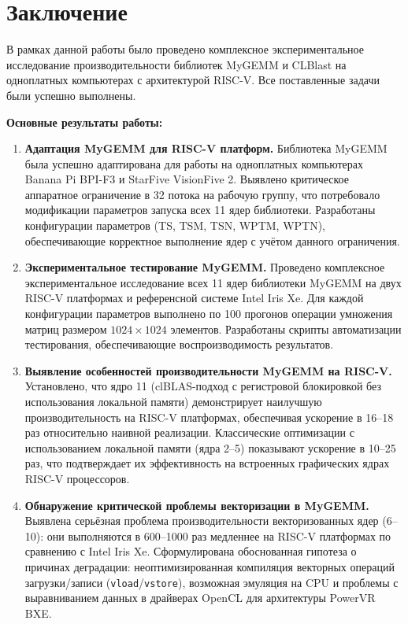 
\section*{Заключение}

В рамках данной работы было проведено комплексное экспериментальное исследование производительности библиотек MyGEMM и CLBlast на одноплатных компьютерах с архитектурой RISC-V. Все поставленные задачи были успешно выполнены.

\textbf{Основные результаты работы:}

\begin{enumerate}
    \item \textbf{Адаптация MyGEMM для RISC-V платформ.} Библиотека MyGEMM была успешно адаптирована для работы на одноплатных компьютерах Banana Pi BPI-F3 и StarFive VisionFive 2. Выявлено критическое аппаратное ограничение в 32 потока на рабочую группу, что потребовало модификации параметров запуска всех 11 ядер библиотеки. Разработаны конфигурации параметров (TS, TSM, TSN, WPTM, WPTN), обеспечивающие корректное выполнение ядер с учётом данного ограничения.
    
    \item \textbf{Экспериментальное тестирование MyGEMM.} Проведено комплексное экспериментальное исследование всех 11 ядер библиотеки MyGEMM на двух RISC-V платформах и референсной системе Intel Iris Xe. Для каждой конфигурации параметров выполнено по 100 прогонов операции умножения матриц размером $1024 \times 1024$ элементов. Разработаны скрипты автоматизации тестирования, обеспечивающие воспроизводимость результатов.
    
    \item \textbf{Выявление особенностей производительности MyGEMM на RISC-V.} Установлено, что ядро 11 (clBLAS-подход с регистровой блокировкой без использования локальной памяти) демонстрирует наилучшую производительность на RISC-V платформах, обеспечивая ускорение в 16--18 раз относительно наивной реализации. Классические оптимизации с использованием локальной памяти (ядра 2--5) показывают ускорение в 10--25 раз, что подтверждает их эффективность на встроенных графических ядрах RISC-V процессоров.
    
    \item \textbf{Обнаружение критической проблемы векторизации в MyGEMM.} Выявлена серьёзная проблема производительности векторизованных ядер (6--10): они выполняются в 600--1000 раз медленнее на RISC-V платформах по сравнению с Intel Iris Xe. Сформулирована обоснованная гипотеза о причинах деградации: неоптимизированная компиляция векторных операций загрузки/записи (\texttt{vload}/\texttt{vstore}), возможная эмуляция на CPU и проблемы с выравниванием данных в драйверах OpenCL для архитектуры PowerVR BXE.
    

\end{enumerate}
